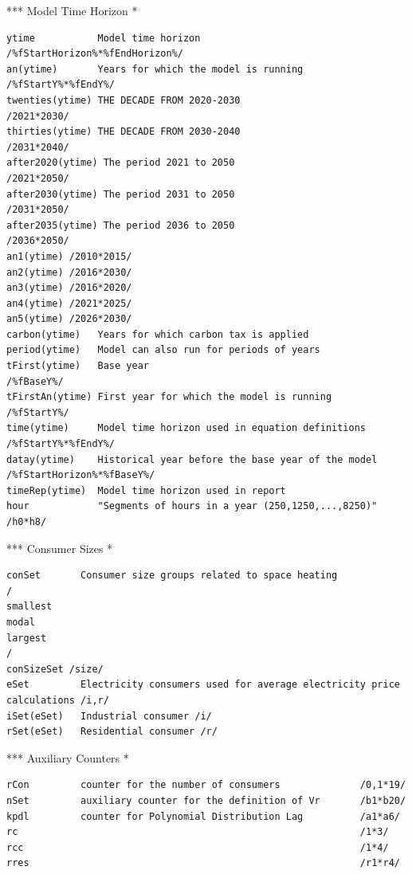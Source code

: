 \documentclass[a4paper,]{scrartcl}
\begin{document}
*** Model Time Horizon *

\begin{lstlisting}
ytime           Model time horizon                                /%fStartHorizon%*%fEndHorizon%/
an(ytime)       Years for which the model is running              /%fStartY%*%fEndY%/
twenties(ytime) THE DECADE FROM 2020-2030                         /2021*2030/
thirties(ytime) THE DECADE FROM 2030-2040                         /2031*2040/
after2020(ytime) The period 2021 to 2050                          /2021*2050/
after2030(ytime) The period 2031 to 2050                          /2031*2050/
after2035(ytime) The period 2036 to 2050                          /2036*2050/
an1(ytime) /2010*2015/
an2(ytime) /2016*2030/
an3(ytime) /2016*2020/
an4(ytime) /2021*2025/
an5(ytime) /2026*2030/
carbon(ytime)   Years for which carbon tax is applied
period(ytime)   Model can also run for periods of years
tFirst(ytime)   Base year                                         /%fBaseY%/
tFirstAn(ytime) First year for which the model is running         /%fStartY%/
time(ytime)     Model time horizon used in equation definitions   /%fStartY%*%fEndY%/
datay(ytime)    Historical year before the base year of the model /%fStartHorizon%*%fBaseY%/
timeRep(ytime)  Model time horizon used in report
hour            "Segments of hours in a year (250,1250,...,8250)" /h0*h8/
\end{lstlisting}

*** Consumer Sizes *

\begin{lstlisting}
conSet       Consumer size groups related to space heating
/
smallest
modal
largest
/
conSizeSet /size/
eSet         Electricity consumers used for average electricity price calculations /i,r/
iSet(eSet)   Industrial consumer /i/
rSet(eSet)   Residential consumer /r/
\end{lstlisting}

*** Auxiliary Counters *

\begin{lstlisting}
rCon         counter for the number of consumers              /0,1*19/
nSet         auxiliary counter for the definition of Vr       /b1*b20/
kpdl         counter for Polynomial Distribution Lag          /a1*a6/
rc                                                            /1*3/
rcc                                                           /1*4/
rres                                                          /r1*r4/
\end{lstlisting}
\end{document}
